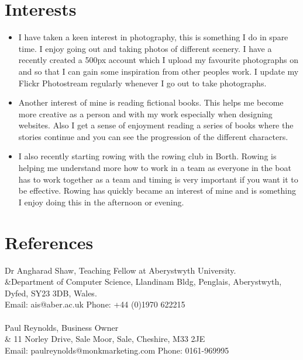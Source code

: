\documentclass[a4paper,10pt]{article}
\begin{document}
\section*{Interests}
\begin{itemize}
\item I have taken a keen interest in photography, this is something I do in spare time. I enjoy going out and taking photos of different scenery. I have a recently created a 500px account which I upload my favourite photographs on and so that I can gain some inspiration from other peoples work. I update my Flickr Photostream regularly whenever I go out to take photographs.
\item Another interest of mine is reading fictional books. This helps me become more creative as a person and with my work especially when designing websites. Also I get a sense of enjoyment reading a series of books where the stories continue and you can see the progression of the different characters.
\item I also recently starting rowing with the rowing club in Borth. Rowing is helping me understand more how to work in a team as everyone in the boat has to work together as a team and timing is very important if you want it to be effective. Rowing has quickly became an interest of mine and is something I enjoy doing this in the afternoon or evening.  
\end{itemize}
\section*{References}
Dr Angharad Shaw, Teaching Fellow at  Aberystwyth University.\\
&Department of Computer Science, Llandinam Bldg, Penglais, Aberystwyth, Dyfed, SY23 3DB, Wales.\\
Email: ais@aber.ac.uk Phone: +44 (0)1970 622215\\
\\
Paul Reynolds, Business Owner\\    
& 11 Norley Drive, Sale Moor, Sale, Cheshire, M33 2JE\\
Email: paulreynolds@monkmarketing.com Phone: 0161-969995\\
\\
\end{document}
